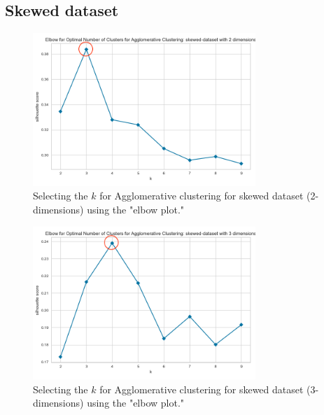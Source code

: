 \subsection{Skewed dataset}
\begin{figure}[H]
  \includegraphics[width=0.75\textwidth]{Appendix//parameter-selection/skewed-dataset-2-agglomerative.png}
  \caption{Selecting the $k$ for Agglomerative clustering for skewed dataset (2-dimensions) using the "elbow plot."}
  \label{hyperparameters:agglomerative-skewed-dataset-2d}
\end{figure}
\begin{figure}[H]
  \includegraphics[width=0.75\textwidth]{Appendix//parameter-selection/skewed-dataset-3-agglomerative.png}
  \caption{Selecting the $k$ for Agglomerative clustering for skewed dataset (3-dimensions) using the "elbow plot."}
  \label{hyperparameters:agglomerative-skewed-dataset-3d}
\end{figure}